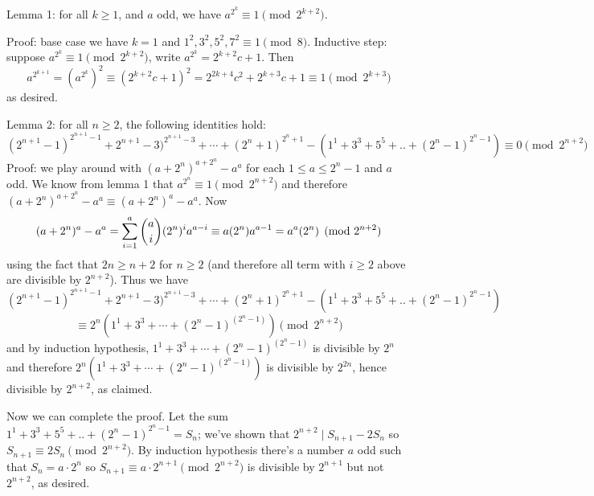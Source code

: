 \documentclass[11pt,a4paper]{article}
\begin{document}
\begin{enumerate}
	Lemma 1: for all $k\ge 1$, and $a$ odd, we have $a^{2^k}\equiv 1\pmod{2^{k+2}}$. 
	
	Proof: base case we have $k=1$ and $1^2, 3^2, 5^2, 7^2\equiv 1\pmod{8}$. Inductive step: suppose $a^{2^k}\equiv 1\pmod{2^{k+2}}$, write $a^{2^k}=2^{k+2}c+1$. Then 
	\[
	a^{2^{k+1}}=(a^{2^k})^2\equiv (2^{k+2}c+1)^2 = 2^{2k+4}c^2+2^{k+3}c+1\equiv 1\pmod{2^{k+3}}
	\]
	as desired. 
	
	Lemma 2: for all $n\ge 2$, the following identities hold: 
	\[
	(2^{n+1} - 1)^{2^{n+1}-1} + 2^{n+1} - 3)^{2^{n+1}-3} + \cdots + (2^n + 1)^{2^n+1} - (1^1 + 3^3 + 5^5 + .. + (2^n - 1)^{2^n-1})\equiv 0\pmod{2^{n+2}}
	\]
	Proof: we play around with $(a+2^n)^{a+2^n}-a^a$ for each $1\le a\le 2^n-1$ and $a$ odd. We know from lemma 1 that $a^{2^n}\equiv 1\pmod{2^{n+2}}$ and therefore $(a+2^n)^{a+2^n}-a^a\equiv (a+2^n)^{a}-a^a$. Now 
	\[
	(a+2^n)^a-a^a=\displaystyle\sum_{i=1}^a \dbinom{a}{i}(2^n)^ia^{a-i}\equiv a(2^n)a^{a-1}=a^a(2^n)\pmod{2^{n+2}}
	\]
	using the fact that $2n\ge n+2$ for $n\ge 2$ (and therefore all term with $i\ge 2$ above are divisible by $2^{n+2}$). Thus we have 
	\[
	(2^{n+1} - 1)^{2^{n+1}-1} + 2^{n+1} - 3)^{2^{n+1}-3} + \cdots + (2^n + 1)^{2^n+1} - (1^1 + 3^3 + 5^5 + .. + (2^n - 1)^{2^n-1})
	\]\[
	\equiv 2^{n}(1^1+3^3+\cdots + (2^n-1)^{(2^n-1)})\pmod{2^{n+2}}
	\]
	and by induction hypothesis, $1^1+3^3+\cdots + (2^n-1)^{(2^n-1)}$ is divisible by $2^n$ and therefore $2^{n}(1^1+3^3+\cdots + (2^n-1)^{(2^n-1)})$ is divisible by $2^{2n}$, hence divisible by $2^{n+2}$, as claimed. 
	
	Now we can complete the proof. Let the sum $1^1 + 3^3 + 5^5 + .. + (2^n - 1)^{2^n-1}=S_n$; we've shown that $2^{n+2}\mid S_{n+1}-2S_n$ so $S_{n+1}\equiv 2S_n\pmod{2^{n+2}}$. By induction hypothesis there's a number $a$ odd such that $S_n=a\cdot 2^{n}$ so $S_{n+1}\equiv a\cdot 2^{n+1}\pmod{2^{n+2}}$ is divisible by $2^{n+1}$ but not $2^{n+2}$, as desired. 
\end{enumerate}
\end{document}
